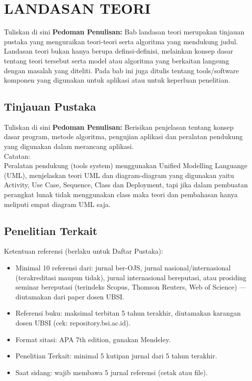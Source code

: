 \chapter{LANDASAN TEORI}


Tuliskan di sini \textbf{Pedoman Penulisan:} Bab landasan teori merupakan tinjauan pustaka yang menguraikan teori-teori serta algoritma yang mendukung judul. Landasan teori bukan hanya berupa definsi-definisi, melainkan konsep dasar tentang teori tersebut serta model atau algoritma yang berkaitan langsung dengan masalah yang diteliti. Pada bab ini juga ditulis tentang tools/software komponen yang digunakan untuk aplikasi atau untuk keperluan penelitian.



\section{Tinjauan Pustaka}


Tuliskan di sini \textbf{Pedoman Penulisan:} Berisikan penjelasan tentang konsep dasar program, metode algoritma, pengujian aplikasi dan peralatan pendukung yang digunakan dalam merancang aplikasi.\\
Catatan:\\
Peralatan pendukung (tools system) menggunakan Unified Modelling Languange (UML), menjelaskan teori UML dan diagram-diagram yang digunakan yaitu Activity, Use Case, Sequence, Class dan Deployment, tapi jika dalam pembuatan perangkat lunak tidak menggunakan class maka teori dan pembahasan hanya meliputi empat diagram UML saja.



\section{Penelitian Terkait}

Ketentuan referensi (berlaku untuk Daftar Pustaka):
\begin{itemize}
    \item Minimal 10 referensi dari: jurnal ber-OJS, jurnal nasional/internasional (terakreditasi maupun tidak), jurnal internasional bereputasi, atau prosiding seminar bereputasi (terindeks Scopus, Thomson Reuters, Web of Science) --- diutamakan dari paper dosen UBSI.
    \item Referensi buku: maksimal terbitan 5 tahun terakhir, diutamakan karangan dosen UBSI (cek: repository.bsi.ac.id).
    \item Format sitasi: APA 7th edition, gunakan Mendeley.
    \item Penelitian Terkait: minimal 5 kutipan jurnal dari 5 tahun terakhir.
    \item Saat sidang: wajib membawa 5 jurnal referensi (cetak atau file).
\end{itemize}


